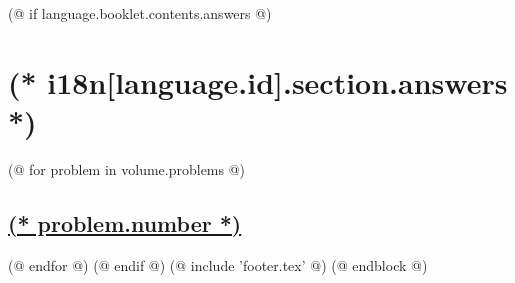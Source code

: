     (@ if language.booklet.contents.answers @)
        \section{(* i18n[language.id].section.answers *)}
        \pagestyle{answers}
        (@ for problem in volume.problems @)%
            \setcounter{problem}{(* problem.number *)}%
            \hypersetup{linkcolor=black}%
            \subsection{%
                \texorpdfstring{%
                    \hyperref[ssc:(* problem.id *)-solution]{(* problem.number *)}%
                }{%
                    (* problem.number *). (* problem.id *)%
                }%
            }%
            \label{ssc:(* problem.id*)-answer}%
            \hypersetup{linkcolor=colour-link}%
        (@ endfor @)
    (@ endif @)
    (@ include 'footer.tex' @)
(@ endblock @)
